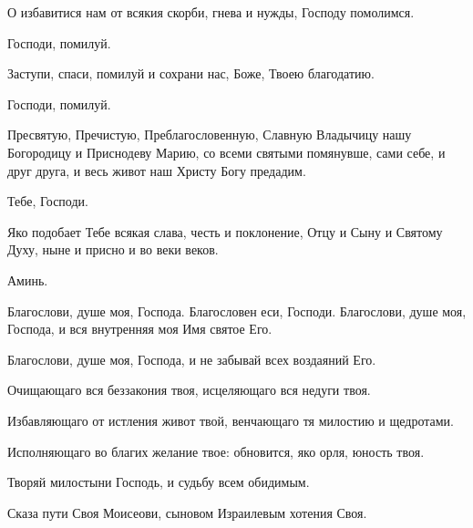 \begin{mymulticols}
 О избавитися нам от всякия скорби, гнева и нужды, Господу помолимся. 

 Господи, помилуй.

 Заступи, спаси, помилуй и сохрани нас, Боже, Твоею благодатию. 

 Господи, помилуй.

 Пресвятую, Пречистую, Преблагословенную, Славную Владычицу нашу Богородицу и Приснодеву Марию, со всеми святыми помянувше, сами себе, и друг друга, и весь живот наш Христу Богу предадим. 

 Тебе, Господи. 

 Яко подобает Тебе всякая слава, честь и поклонение, Отцу и Сыну и Святому Духу, ныне и присно и во веки веков. 

 Аминь.





 Благослови, душе моя, Господа. Благословен еси, Господи. Благослови, душе моя, Господа, и вся внутренняя моя Имя святое Его. 

 Благослови, душе моя, Господа, и не забывай всех воздаяний Его. 

 Очищающаго вся беззакония твоя,  исцеляющаго вся недуги твоя. 

 Избавляющаго от истления живот твой,  венчающаго тя милостию и щедротами. 

 Исполняющаго во благих желание твое:  обновится, яко орля, юность твоя. 

 Творяй милостыни Господь, и судьбу всем обидимым. 

 Сказа пути Своя Моисеови, сыновом Израилевым хотения Своя. 


\end{mymulticols}
